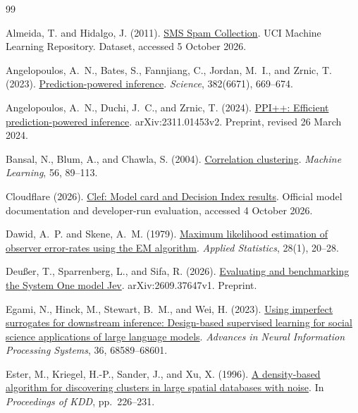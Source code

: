 \documentclass[11pt,a4paper]{article}
\begin{document}
\begingroup
\small\raggedright
\setlength{\bibsep}{0.4em}
\begin{thebibliography}{99}

Almeida, T. and Hidalgo, J. (2011).
\href{https://doi.org/10.24432/C5CC84}{SMS Spam Collection}.
UCI Machine Learning Repository. Dataset, accessed 5 October 2026.


Angelopoulos, A.~N., Bates, S., Fannjiang, C., Jordan, M.~I., and Zrnic, T. (2023).
\href{https://doi.org/10.1126/science.adi6000}{Prediction-powered inference}.
\emph{Science}, 382(6671), 669--674.

Angelopoulos, A.~N., Duchi, J.~C., and Zrnic, T. (2024).
\href{https://arxiv.org/abs/2311.01453v2}{PPI++: Efficient prediction-powered inference}.
arXiv:2311.01453v2. Preprint, revised 26 March 2024.

Bansal, N., Blum, A., and Chawla, S. (2004).
\href{https://doi.org/10.1023/B:MACH.0000033116.57574.95}{Correlation clustering}.
\emph{Machine Learning}, 56, 89--113.

Cloudflare (2026).
\href{https://huggingface.co/Cloudflare/clef}{Clef: Model card and Decision Index results}.
Official model documentation and developer-run evaluation, accessed 4 October 2026.

Dawid, A.~P. and Skene, A.~M. (1979).
\href{https://doi.org/10.2307/2346806}{Maximum likelihood estimation of observer error-rates using the EM algorithm}.
\emph{Applied Statistics}, 28(1), 20--28.

Deu{\ss}er, T., Sparrenberg, L., and Sifa, R. (2026).
\href{https://arxiv.org/abs/2609.37647v1}{Evaluating and benchmarking the System One model Jev}.
arXiv:2609.37647v1. Preprint.

Egami, N., Hinck, M., Stewart, B.~M., and Wei, H. (2023).
\href{https://proceedings.neurips.cc/paper_files/paper/2023/hash/d862f7f5445255090de13b825b880d59-Abstract-Conference.html}{Using imperfect surrogates for downstream inference: Design-based supervised learning for social science applications of large language models}.
\emph{Advances in Neural Information Processing Systems}, 36, 68589--68601.

Ester, M., Kriegel, H.-P., Sander, J., and Xu, X. (1996).
\href{https://f.aaai.org/Papers/KDD/1996/KDD96-037.pdf}{A density-based algorithm for discovering clusters in large spatial databases with noise}.
In \emph{Proceedings of KDD}, pp.~226--231.


\end{thebibliography}
\end{document}
